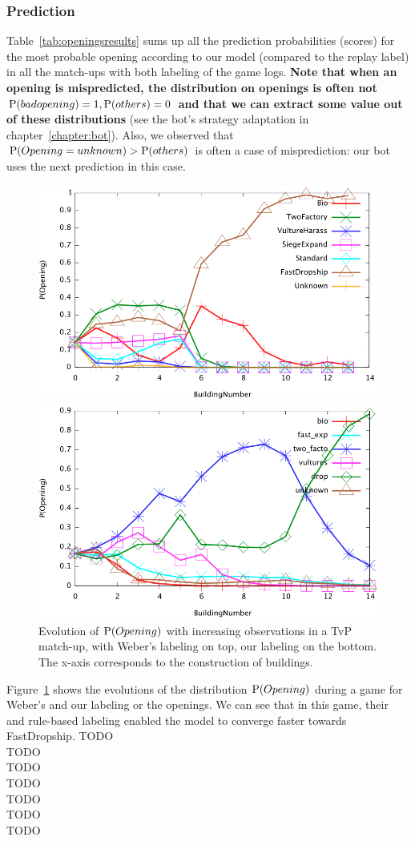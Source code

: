 \subsubsection{Prediction}
Table~\ref{tab:openingsresults} sums up all the prediction probabilities (scores) for the most probable opening according to our model (compared to the replay label) in all the match-ups with both labeling of the game logs. \textbf{Note that when an opening is mispredicted, the distribution on openings is often not $\mathrm{P}(badopening)=1, \mathrm{P}(others)=0$ and that we can extract some value out of these distributions} (see the bot's strategy adaptation in chapter~\ref{chapter:bot}). Also, we observed that $\mathrm{P}(Opening=unknown)>\mathrm{P}(others)$ is often a case of misprediction: our bot uses the next prediction in this case. 

\begin{figure}[h]
\centerline{\includegraphics[width=0.7\columnwidth]{images/TvP_prediction.png}}
\centerline{\includegraphics[width=0.7\columnwidth]{images/TvPx_prediction.png}}
\caption{Evolution of $\mathrm{P}(Opening)$ with increasing observations in a TvP match-up, with Weber's labeling on top, our labeling on the bottom. The x-axis corresponds to the construction of buildings.}
\label{fig:openingsprediction}
\end{figure}

Figure~\ref{fig:openingsprediction} shows the evolutions of the distribution $\mathrm{P}(Opening)$ during a game for Weber's and our labeling or the openings. We can see that in this game, their  and rule-based labeling enabled the model to converge faster towards FastDropship.
TODO\\
TODO\\
TODO\\
TODO\\
TODO\\
TODO\\
TODO\\

